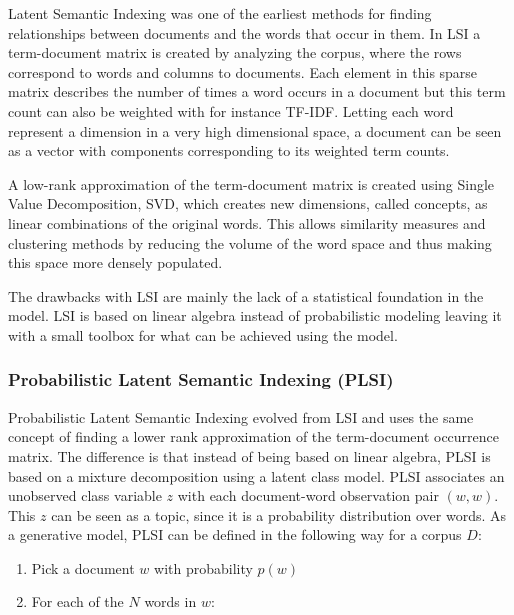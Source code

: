 \documentclass[12pt]{report}
\begin{document}
Latent Semantic Indexing was one of the earliest methods for finding relationships 
between documents and the words that occur in them. In LSI a term-document matrix 
is created by analyzing the corpus, where the rows correspond to words and columns 
to documents. Each element in this sparse matrix describes the number of times a 
word occurs in a document but this term count can also be weighted with for 
instance TF-IDF. Letting each word represent a dimension in a very high dimensional 
space, a document can be seen as a vector with components corresponding to its 
weighted term counts.

A low-rank approximation of the term-document matrix is created using Single Value 
Decomposition, SVD, which creates new dimensions, called concepts, as linear 
combinations of the original words. This allows similarity measures and clustering  methods by reducing the volume of the word space and thus making this space more 
densely populated.


The drawbacks with LSI are mainly the lack of a statistical foundation in the model. 
LSI is based on linear algebra instead of probabilistic modeling leaving it with 
a small toolbox for what can be achieved using the model.
	

\subsubsection{Probabilistic Latent Semantic Indexing (PLSI)}


Probabilistic Latent Semantic Indexing evolved from LSI and uses the same concept of 
finding a lower rank approximation of the term-document occurrence matrix. 
The difference is that instead of being based on linear algebra, PLSI is based on a 
mixture decomposition using a latent class model. PLSI associates an unobserved 
class variable $z$ with each document-word observation pair $(w, w)$. This $z$ can be seen as a topic, since it is a probability distribution over words. As a generative 
model, PLSI can be defined in the following way for a corpus $D$:

\begin{enumerate}
\item Pick a document $w$ with probability $p(w)$
\item For each of the $N$ words in $w$:
\end{enumerate}
\end{document}
